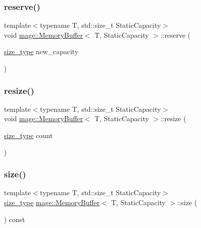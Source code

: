 \subsubsection{\texorpdfstring{reserve()}{reserve()}}
{\footnotesize\ttfamily template$<$typename T, std\+::size\+\_\+t Static\+Capacity$>$ \\
void \mbox{\hyperlink{classmage_1_1_memory_buffer}{mage\+::\+Memory\+Buffer}}$<$ T, Static\+Capacity $>$\+::reserve (\begin{DoxyParamCaption}\item[{\mbox{\hyperlink{classmage_1_1_memory_buffer_a77b459da2e6f1c57c21467a6eff8e9f9}{size\+\_\+type}}}]{new\+\_\+capacity }\end{DoxyParamCaption})}

\mbox{\label{classmage_1_1_memory_buffer_aee1f82e6b01a4f7ba7843415cd4bc758}} 
\subsubsection{\texorpdfstring{resize()}{resize()}}
{\footnotesize\ttfamily template$<$typename T, std\+::size\+\_\+t Static\+Capacity$>$ \\
void \mbox{\hyperlink{classmage_1_1_memory_buffer}{mage\+::\+Memory\+Buffer}}$<$ T, Static\+Capacity $>$\+::resize (\begin{DoxyParamCaption}\item[{\mbox{\hyperlink{classmage_1_1_memory_buffer_a77b459da2e6f1c57c21467a6eff8e9f9}{size\+\_\+type}}}]{count }\end{DoxyParamCaption})}

\mbox{\label{classmage_1_1_memory_buffer_a3a3cbce15e861835a06c558d0707cc09}} 
\subsubsection{\texorpdfstring{size()}{size()}}
{\footnotesize\ttfamily template$<$typename T, std\+::size\+\_\+t Static\+Capacity$>$ \\
\mbox{\hyperlink{classmage_1_1_memory_buffer_a77b459da2e6f1c57c21467a6eff8e9f9}{size\+\_\+type}} \mbox{\hyperlink{classmage_1_1_memory_buffer}{mage\+::\+Memory\+Buffer}}$<$ T, Static\+Capacity $>$\+::size (\begin{DoxyParamCaption}{ }\end{DoxyParamCaption}) const\hspace{0.3cm}{\ttfamily [noexcept]}}

